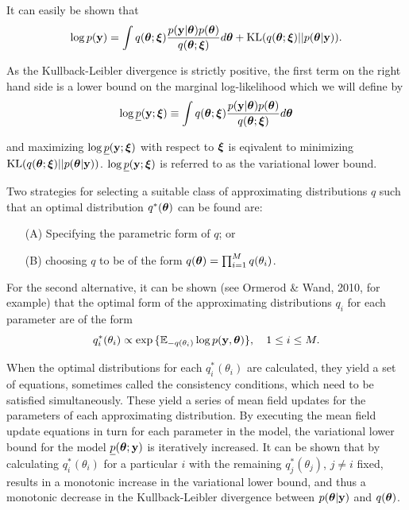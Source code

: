 \documentclass{amsart}[12pt]
\begin{document}
\noindent It can easily be shown that
\[
	\displaystyle \log p({\bf y}) = \int q({\boldsymbol \theta};{\boldsymbol \xi})\frac{p({\bf y}|{\boldsymbol \theta})p({\boldsymbol \theta})}{q({\boldsymbol \theta};{\boldsymbol \xi})} d{\boldsymbol \theta} + \text{KL}(q({\boldsymbol \theta};{\boldsymbol \xi})||p({\boldsymbol \theta}|{\bf y})).
\]

\noindent As the Kullback-Leibler divergence is strictly positive, the first term on the right hand side
is a lower bound on the marginal log-likelihood which we will define by
$$
\displaystyle \log \underline{p}({\bf y};{\boldsymbol \xi}) \equiv \int q({\boldsymbol \theta};{\boldsymbol \xi})\frac{p({\bf y}|{\boldsymbol \theta})p({\boldsymbol \theta})}{q({\boldsymbol \theta};{\boldsymbol \xi})} d{\boldsymbol \theta}
$$

\noindent and maximizing $\log \underline{p}({\bf y};{\boldsymbol \xi})$ with respect to ${\boldsymbol \xi}$ is eqivalent to minimizing
$\text{KL}(q({\boldsymbol \theta};{\boldsymbol \xi})||p({\boldsymbol \theta}|{\bf y}))$. $\log \underline{p}({\bf y};{\boldsymbol \xi})$ is referred to as the
variational lower bound.

Two strategies for selecting a suitable class of approximating distributions $q$ such that
an optimal distribution $q^*({\boldsymbol \theta})$ can be found are:
\begin{enumerate}
	\item[(A)] Specifying the parametric form of $q$; or 
	\item[(B)] choosing $q$ to be of the form $q({\boldsymbol \theta}) = \prod_{i=1}^M q(\theta_i)$.
\end{enumerate}

\noindent For the second alternative,
it can be shown (see Ormerod \& Wand, 2010, for example) that the optimal form of the
approximating distributions $q_i$ for each parameter are of the form
\begin{equation}\label{eq:consistency}
	q_i^*(\theta_i) \propto \exp{\{ {\mathbb E}_{-q(\theta_i)} \log p({\bf y}, {\boldsymbol\theta}) \}},  \quad 1\le i\le M.
\end{equation}

\noindent When the optimal distributions for each $q_i^*(\theta_i)$ are calculated, they yield a set of
equations, sometimes called the consistency conditions, which need to be  satisfied simultaneously. These
yield a series of mean field updates for the parameters of each approximating distribution. By executing the
mean field update equations in turn for each parameter in the model, the variational lower bound for the model
$\underline{p}({\boldsymbol \theta}; {\bf y})$ is iteratively increased. It can be shown that by calculating $q_i^*(\theta_i)$ for 
a particular $i$ with the remaining $q_j^*(\theta_j)$, $j\ne i$ fixed, results in a monotonic increase in the
variational lower bound, and thus a monotonic decrease in the Kullback-Leibler divergence between
$p({\boldsymbol \theta}|{\bf y})$ and $q({\boldsymbol \theta})$.
\end{document}
